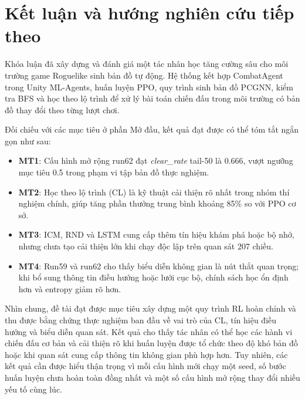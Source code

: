 \clearpage
{}

\chapter*{Kết luận và hướng nghiên cứu tiếp theo}


Khóa luận đã xây dựng và đánh giá một tác nhân học tăng cường sâu cho môi trường game Roguelike sinh bản đồ tự động. Hệ thống kết hợp CombatAgent trong Unity ML-Agents, huấn luyện PPO, quy trình sinh bản đồ PCGNN, kiểm tra BFS và học theo lộ trình để xử lý bài toán chiến đấu trong môi trường có bản đồ thay đổi theo từng lượt chơi.

Đối chiếu với các mục tiêu ở phần Mở đầu, kết quả đạt được có thể tóm tắt ngắn gọn như sau:

\renewcommand{\labelitemi}{$-$}
\begin{itemize}
    \item \textbf{MT1}: Cấu hình mở rộng run62 đạt \textit{clear\_rate} tail-50 là 0.666, vượt ngưỡng mục tiêu 0.5 trong phạm vi tập bản đồ thực nghiệm.
    \item \textbf{MT2}: Học theo lộ trình (CL) là kỹ thuật cải thiện rõ nhất trong nhóm thí nghiệm chính, giúp tăng phần thưởng trung bình khoảng 85\% so với PPO cơ sở.
    \item \textbf{MT3}: ICM, RND và LSTM cung cấp thêm tín hiệu khám phá hoặc bộ nhớ, nhưng chưa tạo cải thiện lớn khi chạy độc lập trên quan sát 207 chiều.
    \item \textbf{MT4}: Run59 và run62 cho thấy biểu diễn không gian là nút thắt quan trọng; khi bổ sung thông tin điều hướng hoặc lưới cục bộ, chính sách học ổn định hơn và entropy giảm rõ hơn.
\end{itemize}

Nhìn chung, đề tài đạt được mục tiêu xây dựng một quy trình RL hoàn chỉnh và thu được bằng chứng thực nghiệm ban đầu về vai trò của CL, tín hiệu điều hướng và biểu diễn quan sát. Kết quả cho thấy tác nhân có thể học các hành vi chiến đấu cơ bản và cải thiện rõ khi huấn luyện được tổ chức theo độ khó bản đồ hoặc khi quan sát cung cấp thông tin không gian phù hợp hơn. Tuy nhiên, các kết quả cần được hiểu thận trọng vì mỗi cấu hình mới chạy một seed, số bước huấn luyện chưa hoàn toàn đồng nhất và một số cấu hình mở rộng thay đổi nhiều yếu tố cùng lúc.

\vspace{0.5cm}

